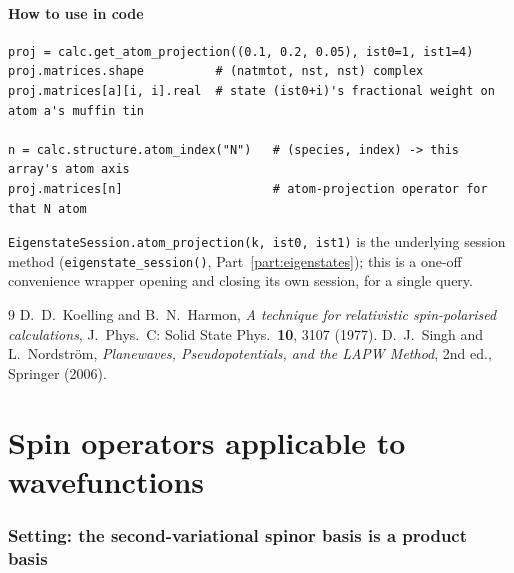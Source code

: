 \documentclass[11pt]{article}
\begin{document}
\subsection{How to use in code}

\begin{verbatim}
proj = calc.get_atom_projection((0.1, 0.2, 0.05), ist0=1, ist1=4)
proj.matrices.shape          # (natmtot, nst, nst) complex
proj.matrices[a][i, i].real  # state (ist0+i)'s fractional weight on atom a's muffin tin

n = calc.structure.atom_index("N")   # (species, index) -> this array's atom axis
proj.matrices[n]                     # atom-projection operator for that N atom
\end{verbatim}
\texttt{EigenstateSession.atom\_projection(k, ist0, ist1)} is the underlying session
method (\texttt{eigenstate\_session()}, Part~\ref{part:eigenstates}); this is a one-off
convenience wrapper opening and closing its own session, for a single query.

\begin{thebibliography}{9}
D.~D.~Koelling and B.~N.~Harmon,
\emph{A technique for relativistic spin-polarised calculations},
J.\ Phys.\ C: Solid State Phys.\ \textbf{10}, 3107 (1977).
D.~J.~Singh and L.~Nordstr\"om,
\emph{Planewaves, Pseudopotentials, and the LAPW Method}, 2nd ed.,
Springer (2006).
\end{thebibliography}

\part{Spin operators applicable to wavefunctions}
\label{part:spin}

\section{Setting: the second-variational spinor basis is a product basis}
\end{document}
